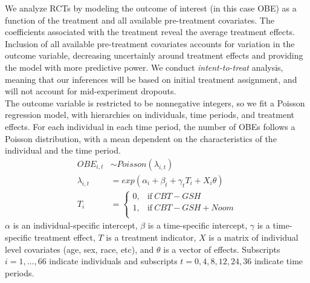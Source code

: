 \documentclass{article}
\begin{document}
We analyze RCTs by modeling the outcome of interest (in this case OBE) as a function of the treatment and all available pre-treatment covariates.  The coefficients associated with the treatment reveal the average treatment effects.  Inclusion of all available pre-treatment covariates accounts for variation in the outcome variable, decreasing uncertainly around treatment effects and providing the model with more predictive power.  We conduct \emph{intent-to-treat} analysis, meaning that our inferences will be based on initial treatment assignment, and will not account for mid-experiment dropouts. \\
The outcome variable is restricted to be nonnegative integers, so we fit a Poisson regression model, with hierarchies on individuals, time periods, and treatment effects.  For each individual in each time period, the number of OBEs follows a Poisson distribution, with a mean dependent on the characteristics of the individual and the time period.  
\begin{align}
OBE_{i,t} &\sim Poisson(\lambda_{i,t}) \\
\lambda_{i,t} &= exp(\alpha_i + \beta_t + \gamma_tT_i + X_i\theta) \\
T_i &=
    \begin{cases}
      0, & \text{if}\ CBT-GSH \\
      1, & \text{if}\ CBT-GSH + Noom \\
    \end{cases}
\end{align}
$\alpha$ is an individual-specific intercept, $\beta$ is a time-specific intercept, $\gamma$ is a time-specific treatment effect, $T$ is a treatment indicator, $X$ is a matrix of individual level covariates (age, sex, race, etc), and $\theta$ is a vector of effects. Subscripts $i = 1, ..., 66$ indicate individuals and subscripts $t = 0, 4, 8, 12, 24, 36$ indicate time periods.
\end{document}
